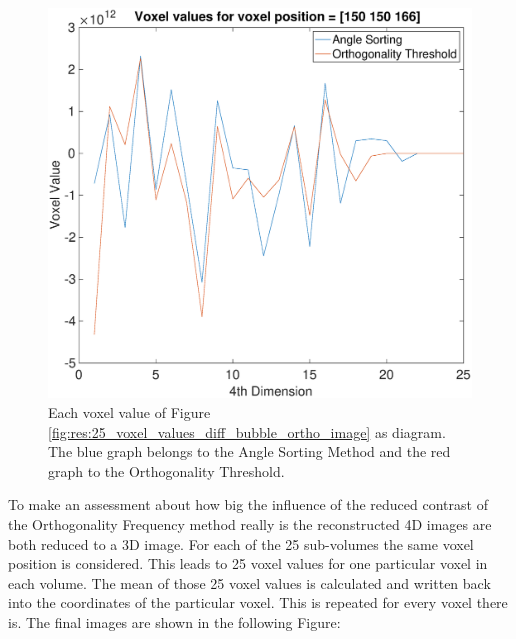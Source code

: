 \begin{figure}[H]
    \centering
    \includegraphics[width=0.82\linewidth]{Graphics/Results/Diff_angle_sort_orthogonality/diff_ortho_bubble_voxelvalues_150150166_sort.eps}
    \caption{Each voxel value of Figure \ref{fig:res:25_voxel_values_diff_bubble_ortho_image} as diagram. The blue graph belongs to the Angle Sorting Method and the red graph to the Orthogonality Threshold. }
    \label{fig:Voxel_value_25}
\end{figure}


To make an assessment about how big the influence of the reduced contrast of the Orthogonality Frequency method really is the reconstructed 4D images are both reduced to a 3D image. For each of the 25 sub-volumes the same voxel position is considered. This leads to 25 voxel values for one particular voxel in each volume. The mean of those 25 voxel values is calculated and written back into the coordinates of the particular voxel. This is repeated for every voxel there is. The final images are shown in the following Figure:


